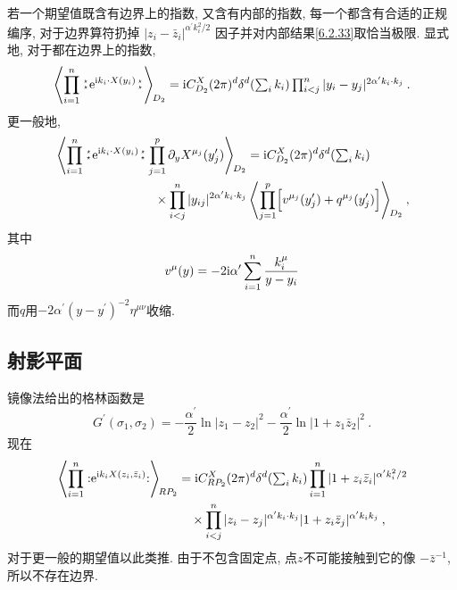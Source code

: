 若一个期望值既含有边界上的指数, 又含有内部的指数, 每一个都含有合适的正规编序, 
对于边界算符扔掉 $|z_{i}-\bar{z}_{i}|^{\alpha^{\prime} k_{i}^{2} / 2}$ 因子并对内部结果\eqref{6.2.33}取恰当极限. 
显式地, 对于都在边界上的指数,
\begin{equation}
	\left\langle\prod_{i=1}^{n} \bno \me^{\mi k_{i} \cdot X(y_{i})} \bno \right\rangle\bigg._{\!\!D_{2}}
	=\mi C_{D_{2}}^{X}(2 \pi)^{d} \delta^{d}(\textstyle{\sum_{i} k_{i}} ) 
	\prod_{i<j}^{n}|y_{i}-y_{j}|^{2 \alpha^{\prime} k_{i} \cdot k_{j}} \:. \label{6.2.35}
\end{equation}
更一般地,
\begin{align}
& \left\langle\prod_{i=1}^{n} \bno \me^{\mi k_{i} \cdot X(y_{i})} \bno 
\prod_{j=1}^{p} \partial_{y}X^{\mu_{j}}(y_{j}^{\prime})\right\rangle\bigg._{\!\!D_{2}}
= \mi C_{D_{2}}^{X}(2 \pi)^{d} \delta^{d}({\textstyle \sum_{i} k_{i}})  \nonumber \\
&\qquad \qquad \qquad \qquad  \times \prod_{i<j}^{n}|y_{i j}|^{2 \alpha^{\prime} k_{i} \cdot k_{j}}
\left\langle\prod_{j=1}^{p}\Bigl[v^{\mu_{j}}(y_{j}^{\prime})+q^{\mu_{j}}(y_{j}^{\prime})\Bigr]\right\rangle\bigg._{\!\! D_{2}} \:, 
\label{6.2.36}
\end{align}
其中
\begin{equation}
	v^{\mu}(y)=-2 \mathrm{i} \alpha^{\prime} \sum_{i=1}^{n} \frac{k_{i}^{\mu}}{y-y_{i}} \label{6.2.37}
\end{equation}
而$q$用$-2 \alpha^{\prime}(y-y^{\prime})^{-2} \eta^{\mu \nu}$收缩.

\subsection*{射影平面}
镜像法给出的格林函数是
\begin{equation}
	G^{\prime}(\sigma_{1}, \sigma_{2})=-\frac{\alpha^{\prime}}{2} \ln |z_{1}-z_{2}|^{2}
	-\frac{\alpha^{\prime}}{2} \ln |1+z_{1} \bar{z}_{2}|^{2} \:. \label{6.2.38}
\end{equation}
现在
	\begin{align}
		\left\langle\prod_{i=1}^{n}:\mathrel{\mathrm{e}^{\mathrm{i} k_{i} X(z_{i}, \bar{z}_{i})}}:\right\rangle\bigg._{\!\! RP_{2}} 
		&=\mathrm{i} C_{RP_{2}}^{X}(2 \pi)^{d} \delta^{d}({\textstyle\sum_{i} k_{i}}) 
		\prod_{i=1}^{n}|1+z_{i} \bar{z}_{i}|^{\alpha^{\prime} k_{i}^{2} / 2} \nonumber \\
		&\quad  \times \prod_{i<j}^{n}|z_{i}-z_{j}|^{\alpha^{\prime} k_{i} \cdot k_{j}}|1+z_{i} \bar{z}_{j}|^{\alpha^{\prime} k_{i} k_{j}} \:, \label{6.2.39}
	\end{align}
对于更一般的期望值以此类推. 由于不包含固定点, 点$z$不可能接触到它的像 $-\bar{z}^{-1}$, 所以不存在边界.

